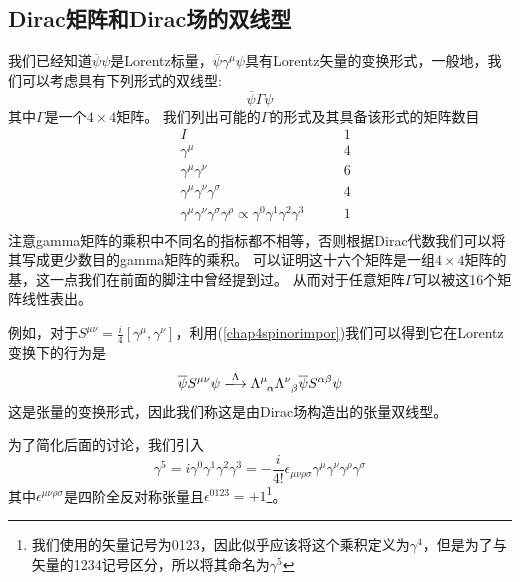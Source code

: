 \subsection{Dirac矩阵和Dirac场的双线型}
我们已经知道$\overline{\psi}\psi$是Lorentz标量，$\overline{\psi}\gamma^{\mu}\psi$具有Lorentz矢量的变换形式，一般地，我们可以考虑具有下列形式的双线型:
\begin{equation}
    \overline{\psi}\Gamma\psi
\end{equation}
其中$\Gamma$是一个$4\times 4$矩阵。
我们列出可能的$\Gamma$的形式及其具备该形式的矩阵数目
\begin{equation*}
    \begin{aligned}
    &I\quad\quad &1\\
    &\gamma^{\mu}\quad\quad &4\\
    &\gamma^{\mu}\gamma^{\nu}\quad\quad &6\\
    &\gamma^{\mu}\gamma^{\nu}\gamma^{\sigma}\quad\quad &4\\
    &\gamma^{\mu}\gamma^{\nu}\gamma^{\sigma}\gamma^{\rho}\propto\gamma^{0}\gamma^{1}\gamma^{2}\gamma^{3}\quad\quad &1\\
    \end{aligned}
\end{equation*}
注意gamma矩阵的乘积中不同名的指标都不相等，否则根据Dirac代数我们可以将其写成更少数目的gamma矩阵的乘积。
可以证明这十六个矩阵是一组$4 \times 4$矩阵的基，这一点我们在前面的脚注中曾经提到过。
从而对于任意矩阵$\Gamma$可以被这16个矩阵线性表出。

例如，对于$S^{\mu\nu}=\frac{i}{4}\left[\gamma^{\mu},\gamma^{\nu}\right]$，利用(\ref{chap4spinorimpor})我们可以得到它在Lorentz变换下的行为是
\begin{equation}
    \overline{\psi}S^{\mu\nu}\psi\xlongrightarrow{\Lambda}\Lambda^{\mu}_{\;\;\alpha}\Lambda^{\nu}_{\;\;\beta} \overline{\psi}S^{\alpha\beta}\psi
\end{equation}
这是张量的变换形式，因此我们称这是由Dirac场构造出的张量双线型。

为了简化后面的讨论，我们引入
\begin{equation}
    \gamma^{5}=i\gamma^{0}\gamma^{1}\gamma^{2}\gamma^{3}=-\frac{i}{4!}\epsilon_{\mu\nu\rho\sigma}\gamma^{\mu}\gamma^{\nu}\gamma^{\rho}\gamma^{\sigma}
\end{equation}
其中$\epsilon^{\mu\nu\rho\sigma}$是四阶全反对称张量且$\epsilon^{0123}=+1$\footnote{我们使用的矢量记号为0123，因此似乎应该将这个乘积定义为$\gamma^{4}$，但是为了与矢量的1234记号区分，所以将其命名为$\gamma^{5}$}。

